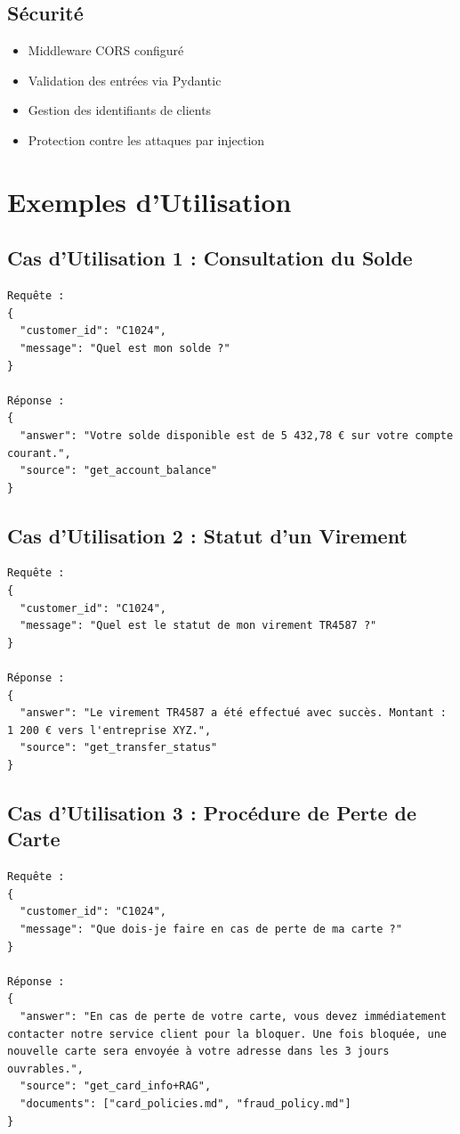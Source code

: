 \documentclass[12pt,a4paper]{article}
\begin{document}
\subsection*{Sécurité}
\begin{itemize}
    \item Middleware CORS configuré
    \item Validation des entrées via Pydantic
    \item Gestion des identifiants de clients
    \item Protection contre les attaques par injection
\end{itemize}

\section*{Exemples d'Utilisation}

\subsection*{Cas d'Utilisation 1 : Consultation du Solde}
\begin{verbatim}
Requête :
{
  "customer_id": "C1024",
  "message": "Quel est mon solde ?"
}

Réponse :
{
  "answer": "Votre solde disponible est de 5 432,78 € sur votre compte courant.",
  "source": "get_account_balance"
}
\end{verbatim}

\subsection*{Cas d'Utilisation 2 : Statut d'un Virement}
\begin{verbatim}
Requête :
{
  "customer_id": "C1024",
  "message": "Quel est le statut de mon virement TR4587 ?"
}

Réponse :
{
  "answer": "Le virement TR4587 a été effectué avec succès. Montant : 1 200 € vers l'entreprise XYZ.",
  "source": "get_transfer_status"
}
\end{verbatim}

\subsection*{Cas d'Utilisation 3 : Procédure de Perte de Carte}
\begin{verbatim}
Requête :
{
  "customer_id": "C1024",
  "message": "Que dois-je faire en cas de perte de ma carte ?"
}

Réponse :
{
  "answer": "En cas de perte de votre carte, vous devez immédiatement contacter notre service client pour la bloquer. Une fois bloquée, une nouvelle carte sera envoyée à votre adresse dans les 3 jours ouvrables.",
  "source": "get_card_info+RAG",
  "documents": ["card_policies.md", "fraud_policy.md"]
}
\end{verbatim}
\end{document}
